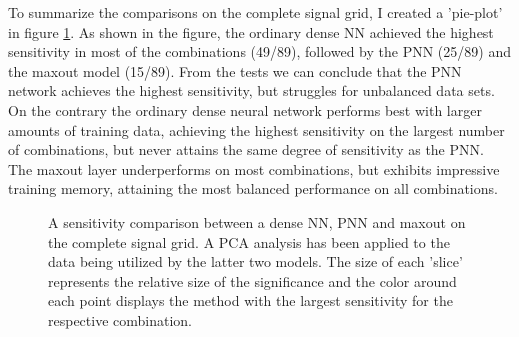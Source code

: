 To summarize the comparisons on the complete signal grid, I created a 'pie-plot' in figure \ref{fig:FSComp}. As shown in the figure, the ordinary dense \ac{NN}
achieved the highest sensitivity in most of the combinations (49/89), followed by the \ac{PNN} (25/89) and the maxout model (15/89). From the tests we can conclude that 
the \ac{PNN} network achieves the highest sensitivity, but struggles for unbalanced data sets. On the contrary the ordinary dense neural network performs best with larger amounts of 
training data, achieving the highest sensitivity on the largest number of combinations, but never attains the same degree of sensitivity as the \ac{PNN}. The maxout layer underperforms on 
most combinations, but exhibits impressive training memory, attaining the most balanced performance on all combinations.
\begin{figure}
    \caption[A sensitivity comparison between a dense \acs{NN}, \acs{PNN} and maxout on the complete signal grid.
    A \acs{PCA} analysis has been applied to the data being utilized by the latter two models.]{
    A sensitivity comparison between a dense \ac{NN}, \ac{PNN} and maxout on the complete signal grid. 
    A \ac{PCA} analysis has been applied to the data being utilized by the latter two models.
    The size of each 'slice' represents the relative size of the significance and the color around each point 
    displays the method with the largest sensitivity for the respective combination.}
    \label{fig:FSComp}
\end{figure}